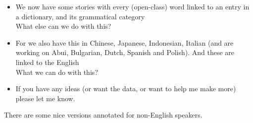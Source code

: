 \documentclass[a4paper,landscape,headrule,footrule,xetex]{foils}
\begin{document}




\begin{itemize}
\item We now have some stories with every (open-class) word linked to
  an entry in a dictionary, and its grammatical category \\ What else can
  we do with this?
\item For  we also have this in Chinese, Japanese, Indonesian,
  Italian (and are working on Abui, Bulgarian, Dutch, Spanish and
  Polish).  And these are linked to the English
  \\ What we can do with this?
\item If you have any ideas (or want the data, or want to help me make
  more) please let me know.

\end{itemize}




There are some nice versions annotated for non-English speakers.
\end{document}

